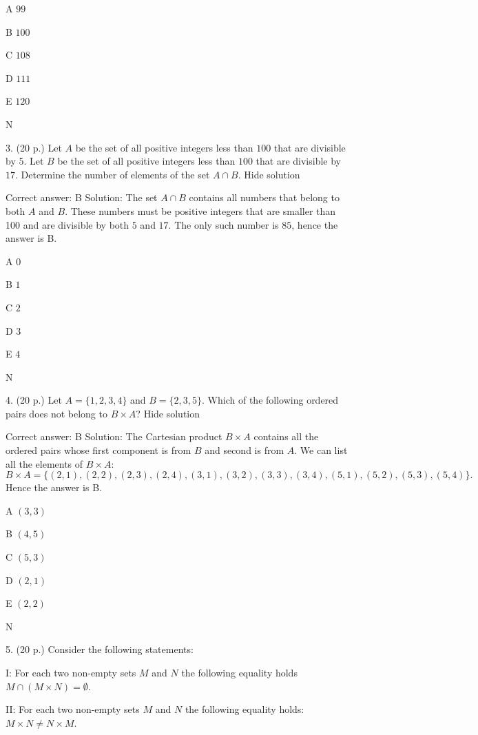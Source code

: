    A    \( 99 \)

   B    \( 100 \)

   C    \( 108 \)

   D    \( 111 \)

   E    \( 120 \)

   N
	

3.	(20 p.)
	Let \( A \) be the set of all positive integers less than \( 100 \) that are divisible by \( 5 \). Let \( B \) be the set of all positive integers less than \( 100 \) that are divisible by \( 17 \). Determine the number of elements of the set \( A\cap B \).
Hide solution

Correct answer: B
Solution: The set \( A\cap B \) contains all numbers that belong to both \( A \) and \( B \). These numbers must be positive integers that are smaller than 100 and are divisible by both \( 5 \) and \( 17 \). The only such number is \( 85 \), hence the answer is B.

   A    \( 0 \)

   B    \( 1 \)

   C    \( 2 \)

   D    \( 3 \)

   E    \( 4 \)

   N
	

4.	(20 p.)
	Let \( A=\{1,2,3,4\} \) and \( B=\{2,3,5\} \). Which of the following ordered pairs does not belong to \( B\times A \)?
Hide solution

Correct answer: B
Solution: The Cartesian product \( B\times A \) contains all the ordered pairs whose first component is from \( B \) and second is from \( A \). We can list all the elements of \( B\times A \): \[ B\times A=\{(2,1), (2,2), (2,3), (2,4), (3,1), (3,2), (3,3), (3,4), (5,1), (5,2), (5,3), (5,4)\}.\] Hence the answer is B.

   A    \( (3,3) \)

   B    \( (4,5) \)

   C    \( (5,3) \)

   D    \( (2,1) \)

   E    \( (2,2) \)

   N
	

5.	(20 p.)
	Consider the following statements:

I: For each two non-empty sets \( M \) and \( N \) the following equality holds \( M\cap (M\times N)=\emptyset \).

II: For each two non-empty sets \( M \) and \( N \) the following equality holds: \( M\times N\neq N\times M \).


